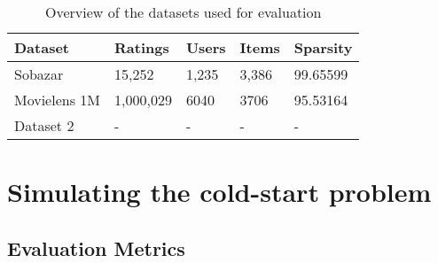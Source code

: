 \begin{table}[H]
    \centering
    \begin{tabular}{|l|l|l|l|l|}
    \hline
	Dataset			& 	Ratings 	& 	Users	& 	Items 	& 	Sparsity 	\\ \hline
	Sobazar 		& 	15,252  	& 	1,235	&	3,386	&	99.65599	\\ \hline
	Movielens 1M	& 	1,000,029   &	6040 	&	3706	&	95.53164	\\ \hline
	Dataset 2 		& 	-  			& 	-		&	-		&	-			\\ \hline
    \end{tabular}
    \label{table:datasets}
    \caption [Overview of the datasets used for evaluation]{Overview of the datasets used for evaluation}
\end{table}


\section{Simulating the cold-start problem}










\subsection{Evaluation Metrics}



